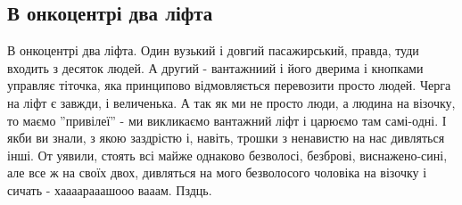  
 
 
 
 
\subsection{В онкоцентрі два ліфта}
\label{sec:22_04_2021.fb.makarenko_oksana.1.bolnica_onkologia}

В онкоцентрі два ліфта. Один вузький і довгий пасажирський, правда, туди
входить з десяток людей. А другий - вантажниий і його дверима і кнопками
управляє тіточка, яка принципово відмовляється перевозити просто людей. Черга
на ліфт є завжди, і величенька. А так як ми не просто люди, а людина на
візочку, то маємо ''привілеї'' - ми викликаємо вантажний ліфт і царюємо там
самі-одні. І якби ви знали, з якою заздрістю і, навіть, трошки з ненавистю на
нас дивляться інші. От уявили, стоять всі майже однаково безволосі, безброві,
виснажено-сині, але все ж на своїх двох, дивляться на мого безволосого чоловіка
на візочку і сичать - хаааарааашооо вааам. Пздць.
